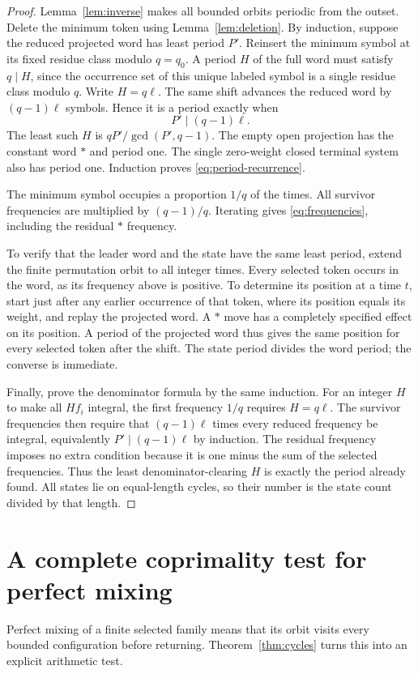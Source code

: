 \documentclass[11pt,letterpaper]{article}
\theoremstyle{definition}
\begin{document}
\begin{proof}
Lemma~\ref{lem:inverse} makes all bounded orbits periodic from the outset.
Delete the minimum token using Lemma~\ref{lem:deletion}. By induction, suppose
the reduced projected word has least period $P'$. Reinsert the minimum
symbol at its fixed residue class modulo $q=q_0$. A period $H$ of the full
word must satisfy $q\mid H$, since the occurrence set of this unique labeled
symbol is a single residue class modulo $q$. Write $H=q\ell$. The same
shift advances the reduced word by $(q-1)\ell$ symbols. Hence it is a period
exactly when
\[
 P'\mid(q-1)\ell.
\]
The least such $H$ is $qP'/\gcd(P',q-1)$. The empty open projection has the
constant word $\ast$ and period one. The single zero-weight closed terminal
system also has period one. Induction proves \eqref{eq:period-recurrence}.

The minimum symbol occupies a proportion $1/q$ of the times. All survivor
frequencies are multiplied by $(q-1)/q$. Iterating gives
\eqref{eq:frequencies}, including the residual $\ast$ frequency.

To verify that the leader word and the state have the same least period,
extend the finite permutation orbit to all integer times. Every selected
token occurs in the word, as its frequency above is positive. To determine
its position at a time $t$, start just after any earlier occurrence of that
token, where its position equals its weight, and replay the projected word.
A $\ast$ move has a completely specified effect on its position. A period
of the projected word thus gives the same position for every selected token
after the shift. The state period divides the word period; the converse is
immediate.

Finally, prove the denominator formula by the same induction. For an integer
$H$ to make all $Hf_i$ integral, the first frequency $1/q$ requires $H=q\ell$.
The survivor frequencies then require that $(q-1)\ell$ times every reduced
frequency be integral, equivalently $P'\mid(q-1)\ell$ by induction. The
residual frequency imposes no extra condition because it is one minus the
sum of the selected frequencies. Thus the least denominator-clearing $H$
is exactly the period already found. All states lie on equal-length cycles,
so their number is the state count divided by that length.
\end{proof}

\section{A complete coprimality test for perfect mixing}\label{sec:mixing}
Perfect mixing of a finite selected family means that its orbit visits every
bounded configuration before returning. Theorem~\ref{thm:cycles} turns this
into an explicit arithmetic test.
\end{document}
